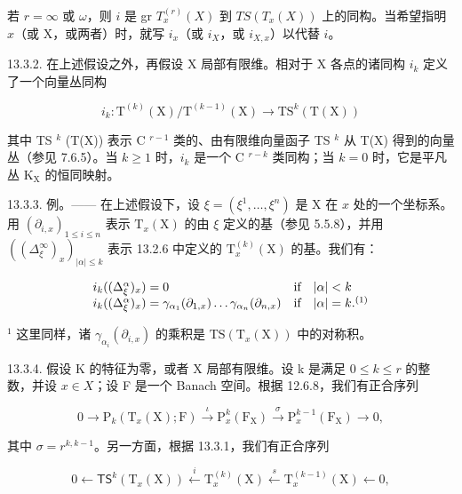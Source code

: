 若 \(r = \infty\) 或 \(\omega\)，则 \(i\) 是 gr \(T_x^{(r)}(X)\) 到 \(TS(T_x(X))\) 上的同构。当希望指明 \(x\)（或 X，或两者）时，就写 \(i_x\)（或 \(i_X\)，或 \(i_{X,x}\)）以代替 \(i\)。

13.3.2. 在上述假设之外，再假设 X 局部有限维。相对于 X 各点的诸同构 \(i_{k}\) 定义了一个向量丛同构

\[
i _ {k} \colon \mathrm{T} ^ {(k)} (\mathrm{X}) / \mathrm{T} ^ {(k - 1)} (\mathrm{X}) \rightarrow \mathrm{TS} ^ {k} (\mathrm{T} (\mathrm{X}))
\]

其中 TS \(^{k}\) (T(X)) 表示 C \(^{r-1}\) 类的、由有限维向量函子 TS \(^{k}\) 从 T(X) 得到的向量丛（参见 7.6.5）。当 \(k \geqslant 1\) 时，\(i_{k}\) 是一个 C \(^{r-k}\) 类同构；当 \(k = 0\) 时，它是平凡丛 \(\mathrm{K}_{\mathrm{X}}\) 的恒同映射。

13.3.3. 例。—— 在上述假设下，设 \(\xi = (\xi^{1}, \ldots, \xi^{n})\) 是 X 在 \(x\) 处的一个坐标系。用 \((\partial_{i,x})_{1 \leqslant i \leqslant n}\) 表示 \(\mathrm{T}_{x}(\mathrm{X})\) 的由 \(\xi\) 定义的基（参见 5.5.8），并用 \(((\Delta_{\xi}^{\infty})_{x})_{|\alpha| \leqslant k}\) 表示 13.2.6 中定义的 \(\mathrm{T}_{x}^{(k)}(\mathrm{X})\) 的基。我们有：

\[
\begin{array}{l l} i _ {k} ((\Delta_ {\xi} ^ {\alpha}) _ {x}) = 0 & \text {if} \quad | \alpha | <   k \\ i _ {k} ((\Delta_ {\xi} ^ {\alpha}) _ {x}) = \gamma_ {\alpha_ {1}} (\partial_ {1, x}) \dots \gamma_ {\alpha_ {n}} (\partial_ {n, x}) & \text {if} \quad | \alpha | = k. ^ {(1)} \end{array}
\]

\(^{1}\) 这里同样，诸 \(\gamma_{\alpha_{i}}(\partial_{i,x})\) 的乘积是 \(\mathrm{TS}(\mathrm{T}_{x}(\mathrm{X}))\) 中的对称积。

13.3.4. 假设 K 的特征为零，或者 X 局部有限维。设 k 是满足 \(0 \leqslant k \leqslant r\) 的整数，并设 \(x \in X\)；设 F 是一个 Banach 空间。根据 12.6.8，我们有正合序列

\[
0 \rightarrow \mathrm{P} _ {k} (\mathrm{T} _ {x} (\mathrm{X}); \mathrm{F}) \stackrel {{\iota}} {{\rightarrow}} \mathrm{P} _ {x} ^ {k} (\mathrm{F} _ {\mathrm{X}}) \stackrel {{\sigma}} {{\rightarrow}} \mathrm{P} _ {x} ^ {k - 1} (\mathrm{F} _ {\mathrm{X}}) \rightarrow 0,\tag{i}
\]

其中 \(\sigma = r^{k, k-1}\)。另一方面，根据 13.3.1，我们有正合序列

\[
0 \leftarrow \mathsf {T S} ^ {k} (\mathrm{T} _ {x} (\mathrm{X})) \stackrel {{i}} {{\leftarrow}} \mathrm{T} _ {x} ^ {(k)} (\mathrm{X}) \stackrel {{s}} {{\leftarrow}} \mathrm{T} _ {x} ^ {(k - 1)} (\mathrm{X}) \leftarrow 0,\tag{ii}
\]

